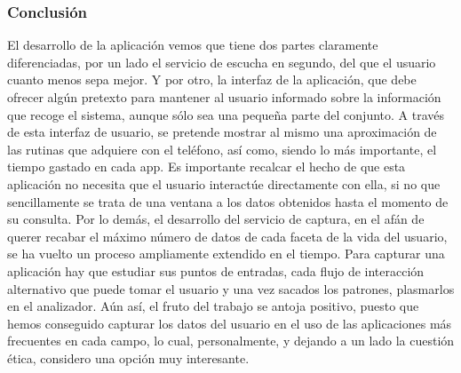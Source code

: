 \documentclass[12pt,a4paper,oneside]{book} %
\begin{document}
\subsubsection{Conclusión}
El desarrollo de la aplicación vemos que tiene dos partes claramente diferenciadas, por un lado el servicio de escucha en segundo, del que el usuario cuanto menos sepa mejor. Y por otro, la interfaz de la aplicación, que debe ofrecer algún pretexto para mantener al usuario informado sobre la información que recoge el sistema, aunque sólo sea una pequeña parte del conjunto. 
\newline \newline 
A través de esta interfaz de usuario, se pretende mostrar al mismo una aproximación de las rutinas que adquiere con el teléfono, así como, siendo lo más importante, el tiempo gastado en cada app. 
\newline \newline 
Es importante recalcar el hecho de que esta aplicación no necesita que el usuario interactúe directamente con ella, si no que sencillamente se trata de una ventana a los datos obtenidos hasta el momento de su consulta.
\newline \newline 
Por lo demás, el desarrollo del servicio de captura, en el afán de querer recabar el máximo número de datos de cada faceta de la vida del usuario, se ha vuelto un proceso ampliamente extendido en el tiempo. Para capturar una aplicación hay que estudiar sus puntos de entradas, cada flujo de interacción alternativo que puede tomar el usuario y una vez sacados los patrones, plasmarlos en el analizador. 
\newline \newline 
Aún así, el fruto del trabajo se antoja positivo, puesto que hemos conseguido capturar los datos del usuario en el uso de las aplicaciones más frecuentes en cada campo, lo cual, personalmente, y dejando a un lado la cuestión ética, considero una opción muy interesante. 
\end{document}

